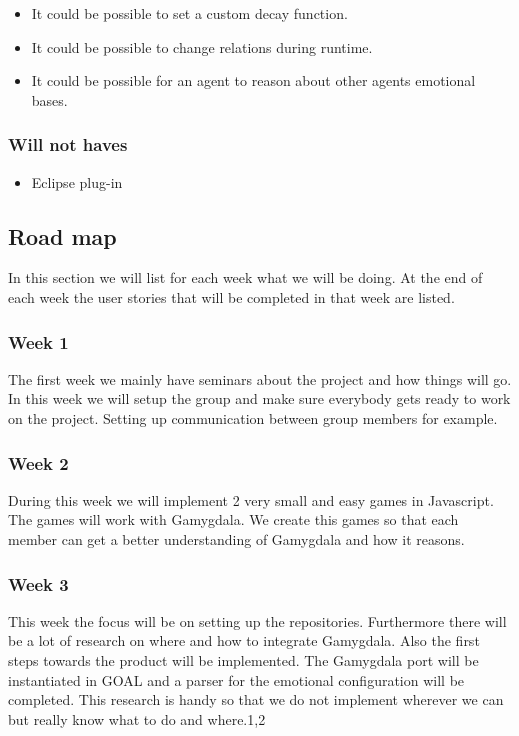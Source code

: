 \documentclass[]{article}
\begin{document}
\begin{itemize}
	\item It could be possible to set a custom decay function.
	\item It could be possible to change relations during runtime.
	
	\item It could be possible for an agent to reason about other agents emotional bases.
\end{itemize}

\subsubsection*{Will not haves}
\begin{itemize}
	\item Eclipse plug-in
\end{itemize}

\subsection{Road map}
In this section we will list for each week what we will be doing. At the end of each week the user stories that will be completed in that week are listed.
\subsubsection*{Week 1}
The first week we mainly have seminars about the project and how things will go. In this week we will setup the group and make sure everybody gets ready to work on the project. Setting up communication between group members for example.

\subsubsection*{Week 2}
During this week we will implement 2 very small and easy games in Javascript. The games will work with Gamygdala. We create this games so that each member can get a better understanding of Gamygdala and how it reasons.

\subsubsection*{Week 3}
This week the focus will be on setting up the repositories. Furthermore there will be a lot of research on where and how to integrate Gamygdala. Also the first steps towards the product will be implemented. The Gamygdala port will be instantiated in GOAL and a parser for the emotional configuration will be completed. This research is handy so that we do not implement wherever we can but really know what to do and where.1,2
\end{document}
